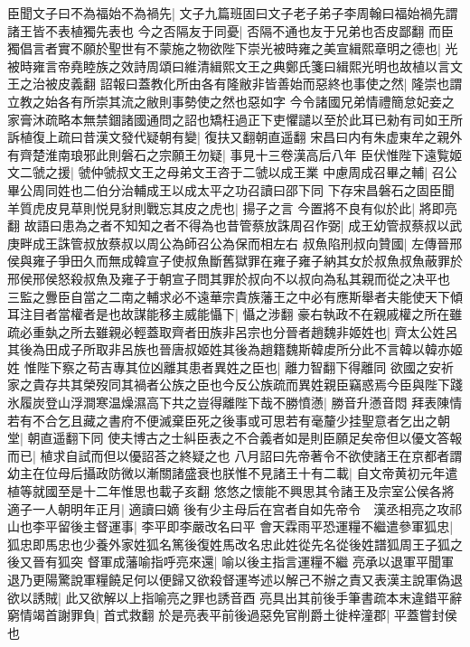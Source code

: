 臣聞文子曰不為福始不為禍先|{
	文子九篇班固曰文子老子弟子李周翰曰福始禍先謂諸王皆不表植獨先表也}
今之否隔友于同憂|{
	否隔不通也友于兄弟也否皮鄙翻}
而臣獨倡言者實不願於聖世有不蒙施之物欲陛下崇光被時雍之美宣緝熙章明之德也|{
	光被時雍言帝堯睦族之效詩周頌曰維清緝熙文王之典鄭氏箋曰緝熙光明也故植以言文王之治被皮義翻}
詔報曰蓋教化所由各有隆敝非皆善始而惡終也事使之然|{
	隆崇也謂立教之始各有所崇其流之敝則事勢使之然也惡如字}
今令諸國兄弟情禮簡怠妃妾之家膏沐疏略本無禁錮諸國通問之詔也矯枉過正下吏懼譴以至於此耳已勑有司如王所訴植復上疏曰昔漢文發代疑朝有變|{
	復扶又翻朝直遥翻}
宋昌曰内有朱虚東牟之親外有齊楚淮南琅邪此則磐石之宗願王勿疑|{
	事見十三卷漢高后八年}
臣伏惟陛下遠覧姬文二虢之援|{
	虢仲虢叔文王之母弟文王咨于二虢以成王業}
中慮周成召畢之輔|{
	召公畢公周同姓也二伯分治輔成王以成太平之功召讀曰邵下同}
下存宋昌磐石之固臣聞羊質虎皮見草則悦見豺則戰忘其皮之虎也|{
	揚子之言}
今置將不良有似於此|{
	將即亮翻}
故語曰患為之者不知知之者不得為也昔管蔡放誅周召作弼|{
	成王幼管叔蔡叔以武庚畔成王誅管叔放蔡叔以周公為師召公為保而相左右}
叔魚陷刑叔向贊國|{
	左傳晉邢侯與雍子爭田久而無成韓宣子使叔魚斷舊獄罪在雍子雍子納其女於叔魚叔魚蔽罪於邢侯邢侯怒殺叔魚及雍子于朝宣子問其罪於叔向不以叔向為私其親而從之决平也}
三監之釁臣自當之二南之輔求必不遠華宗貴族藩王之中必有應斯舉者夫能使天下傾耳注目者當權者是也故謀能移主威能懾下|{
	懾之涉翻}
豪右執政不在親戚權之所在雖疏必重埶之所去雖親必輕蓋取齊者田族非呂宗也分晉者趙魏非姬姓也|{
	齊太公姓呂其後為田成子所取非呂族也晉唐叔姬姓其後為趙籍魏斯韓䖍所分此不言韓以韓亦姬姓}
惟陛下察之苟吉專其位凶離其患者異姓之臣也|{
	離力智翻下得離同}
欲國之安祈家之貴存共其榮歿同其禍者公族之臣也今反公族疏而異姓親臣竊惑焉今臣與陛下踐氷履炭登山浮澗寒温燥濕高下共之豈得離陛下哉不勝憤懣|{
	勝音升懣音悶}
拜表陳情若有不合乞且藏之書府不便滅棄臣死之後事或可思若有毫釐少挂聖意者乞出之朝堂|{
	朝直遥翻下同}
使夫博古之士糾臣表之不合義者如是則臣願足矣帝但以優文答報而已|{
	植求自試而但以優詔荅之終疑之也}
八月詔曰先帝著令不欲使諸王在京都者謂幼主在位母后攝政防微以漸關諸盛衰也朕惟不見諸王十有二載|{
	自文帝黄初元年遣植等就國至是十二年惟思也載子亥翻}
悠悠之懷能不興思其令諸王及宗室公侯各將適子一人朝明年正月|{
	適讀曰嫡}
後有少主母后在宫者自如先帝令　漢丞相亮之攻祁山也李平留後主督運事|{
	李平即李嚴改名曰平}
會天霖雨平恐運糧不繼遣參軍狐忠|{
	狐忠即馬忠也少養外家姓狐名篤後復姓馬改名忠此姓從先名從後姓譜狐周王子狐之後又晉有狐突}
督軍成藩喻指呼亮來還|{
	喻以後主指言運糧不繼}
亮承以退軍平聞軍退乃更陽驚說軍糧饒足何以便歸又欲殺督運岑述以解己不辦之責又表漢主說軍偽退欲以誘賊|{
	此又欲解以上指喻亮之罪也誘音酉}
亮具出其前後手筆書疏本末違錯平辭窮情竭首謝罪負|{
	首式救翻}
於是亮表平前後過惡免官削爵土徙梓潼郡|{
	平蓋嘗封侯也}
